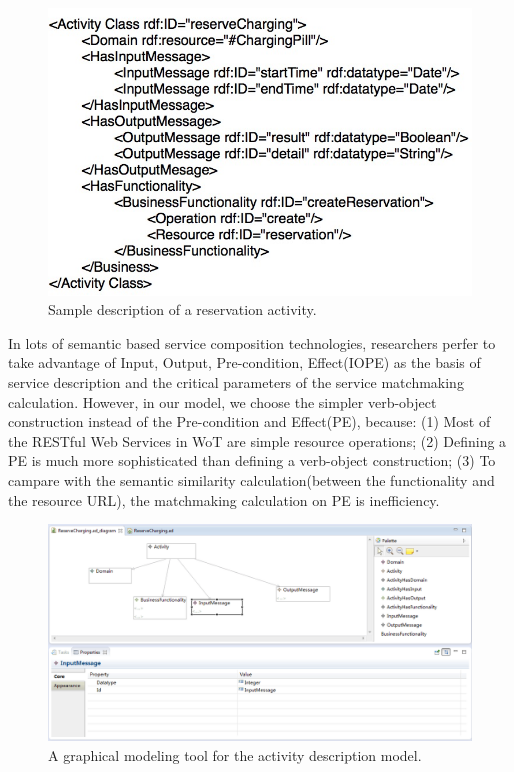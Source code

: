 \begin{figure}[!t]
\centering
\includegraphics[width=1.0\linewidth]{./graph/activitydescriptionmodeldemo}
\caption{Sample description of a reservation activity.}
\label{fig_activitydescriptionmodeldemo}
\end{figure}

In lots of semantic based service composition technologies, researchers perfer to take advantage of Input, Output, Pre-condition, Effect(IOPE) as the basis of service description and the critical parameters of the service matchmaking calculation\cite{syu2012survey}\cite{lee2013service}. However, in our model, we choose the simpler verb-object construction instead of the Pre-condition and Effect(PE), because: (1) Most of the RESTful Web Services in WoT are simple resource operations; (2) Defining a PE is much more sophisticated than defining a verb-object construction; (3) To campare with the semantic similarity calculation(between the functionality and the resource URL), the matchmaking calculation on PE is inefficiency. 

\begin{figure}[!b]
\centering
\includegraphics[width=1.0\linewidth]{./graph/eclipseplugin}
\caption{A graphical modeling tool for the activity description model.}
\label{fig_eclipseplugin}
\end{figure}

